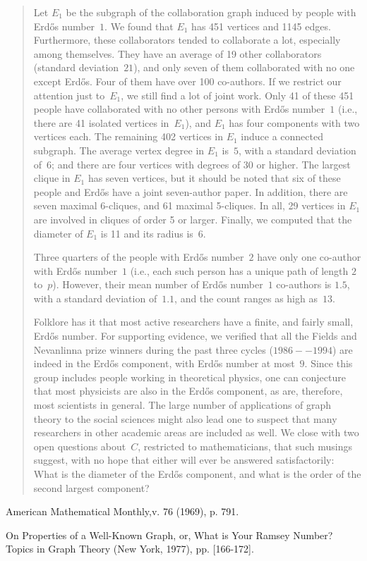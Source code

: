 \begin{quote}
  Let $E_1$ be the subgraph of the collaboration graph induced by people
  with Erd\H os number~$1$. We found that $E_1$ has 451 vertices and
  1145 edges.  Furthermore, these collaborators tended to collaborate a
  lot, especially among themselves. They have an average of 19 other
  collaborators (standard deviation~$21$), and only seven of them
  collaborated with no one except Erd\H os. Four of them have over 100
  co-authors. If we restrict our attention just to~$E_1$, we still find
  a lot of joint work. Only 41 of these 451 people have collaborated
  with no other persons with Erd\H os number~$1$ (i.e., there are 41
  isolated vertices in~$E_1$), and $E_1$ has four components with two
  vertices each. The remaining 402 vertices in $E_1$ induce a connected
  subgraph. The average vertex degree in $E_1$ is~$5$, with a standard
  deviation of~$6$; and there are four vertices with degrees of 30 or
  higher. The largest clique in $E_1$ has seven vertices, but it should
  be noted that six of these people and Erd\H os have a joint
  seven-author paper. In addition, there are seven maximal 6-cliques,
  and 61 maximal 5-cliques. In all, 29 vertices in $E_1$ are involved in
  cliques of order 5 or larger. Finally, we computed that the diameter
  of $E_1$ is 11 and its radius is~6.

  Three quarters of the people with Erd\H os number~$2$ have only one
  co-author with Erd\H os number~$1$ (i.e., each such person has a
  unique path of length $2$ to~$p$). However, their mean number of Erd\H
  os number~$1$ co-authors is $1.5$, with a standard deviation of~$1.1$,
  and the count ranges as high as~$13$.

  Folklore has it that most active researchers have a finite, and fairly
  small, Erd\H os number. For supporting evidence, we verified that all
  the Fields and Nevanlinna prize winners during the past three cycles
  ($1986--1994$) are indeed in the Erd\H os component, with Erd\H os
  number at most~$9$. Since this group includes people working in
  theoretical physics, one can conjecture that most physicists are also
  in the Erd\H os component, as are, therefore, most scientists in
  general. The large number of applications of graph theory to the
  social sciences might also lead one to suspect that many researchers
  in other academic areas are included as well. We close with two open
  questions about~$C$, restricted to mathematicians, that such musings
  suggest, with no hope that either will ever be answered
  satisfactorily: What is the diameter of the Erd\H os component, and
  what is the order of the second largest component?
\end{quote}

\Ref

  {American
  Mathematical Monthly,}{v. 76 (1969), p. 791.}

 {On Properties of a
  Well-Known Graph, or, What is Your Ramsey Number?}  { Topics in Graph
  Theory}{ (New York, 1977), pp.  [166-172].}
